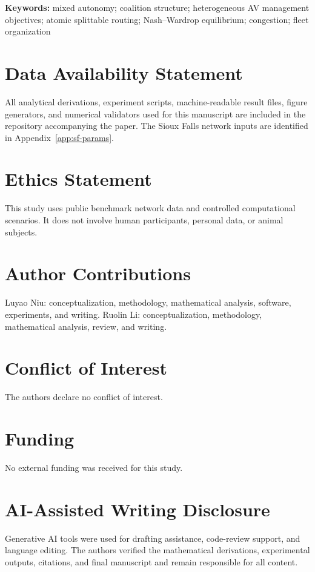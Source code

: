 \documentclass[11pt]{article}
\begin{document}
\noindent\textbf{Keywords:} mixed autonomy; coalition structure; heterogeneous AV management objectives; atomic splittable routing; Nash--Wardrop equilibrium; congestion; fleet organization









\section*{Data Availability Statement}
All analytical derivations, experiment scripts, machine-readable result files, figure generators, and numerical validators used for this manuscript are included in the repository accompanying the paper. The Sioux Falls network inputs are identified in Appendix~\ref{app:sf-params}.

\section*{Ethics Statement}
This study uses public benchmark network data and controlled computational scenarios. It does not involve human participants, personal data, or animal subjects.

\section*{Author Contributions}
Luyao Niu: conceptualization, methodology, mathematical analysis, software, experiments, and writing. Ruolin Li: conceptualization, methodology, mathematical analysis, review, and writing.

\section*{Conflict of Interest}
The authors declare no conflict of interest.

\section*{Funding}
No external funding was received for this study.

\section*{AI-Assisted Writing Disclosure}
Generative AI tools were used for drafting assistance, code-review support, and language editing. The authors verified the mathematical derivations, experimental outputs, citations, and final manuscript and remain responsible for all content.




\end{document}
